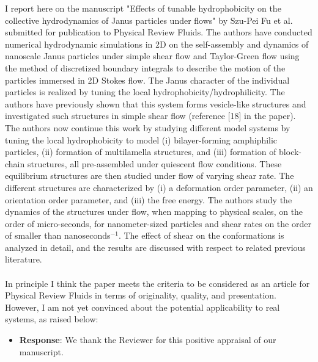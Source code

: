 \documentclass[11pt]{article}
\newcommand{\comment}[1]{{\color{blue} #1}}
\begin{document}
\comment{
\noindent
I report here on the manuscript "Effects of tunable hydrophobicity on the
collective hydrodynamics of Janus particles under flows" by Szu-Pei Fu et al.
submitted for publication to Physical Review Fluids. The authors have conducted
numerical hydrodynamic simulations in 2D on the self-assembly and dynamics of
nanoscale Janus particles under simple shear flow and Taylor-Green flow using
the method of discretized boundary integrals to describe the motion of the
particles immersed in 2D Stokes flow. The Janus character of the individual
particles is realized by tuning the local hydrophobicity/hydrophilicity. The
authors have previously shown that this system forms vesicle-like structures and
investigated such structures in simple shear flow (reference [18] in the paper).
The authors now continue this work by studying different model systems by tuning
the local hydrophobicity to model (i) bilayer-forming amphiphilic particles,
(ii) formation of multilamella structures, and (iii) formation of block-chain
structures, all pre-assembled under quiescent flow conditions. These equilibrium
structures are then studied under flow of varying shear rate. The different
structures are characterized by (i) a deformation order parameter, (ii) an
orientation order parameter, and (iii) the free energy. The authors study the
dynamics of the structures under flow, when mapping to physical scales, on the
order of micro-seconds, for nanometer-sized particles and shear rates on the
order of smaller than nanoseconds$^{-1}$. The effect of shear on the conformations
is analyzed in detail, and the results are discussed with respect to related
previous literature.\\ \\
In principle I think the paper meets the criteria to be considered as an article
for Physical Review Fluids in terms of originality, quality, and presentation.
However, I am not yet convinced about the potential applicability to real
systems, as raised below:}

\begin{itemize}
  \item {\bf Response}: We thank the Reviewer for this positive appraisal of 
our manuscript. 
\end{itemize}

\end{document}
